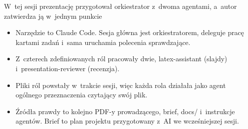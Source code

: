 \begin{frame}{W~tej sesji prezentację przygotował orkiestrator z~dwoma agentami, a~autor zatwierdza ją w~jednym punkcie}
  \begin{itemize}
    \item Narzędzie to Claude Code. Sesja główna jest orkiestratorem, deleguje pracę kartami zadań i~sama uruchamia polecenia sprawdzające.
    \item Z~czterech zdefiniowanych ról pracowały dwie, latex-assistant (slajdy) i~presentation-reviewer (recenzja).
    \item Pliki ról powstały w~trakcie sesji, więc każda rola działała jako agent ogólnego przeznaczenia czytający swój plik.
    \item Źródła prawdy to kolejno PDF-y prowadzącego, brief, docs/ i~instrukcje agentów. Brief to plan projektu przygotowany z~AI we wcześniejszej sesji.
  \end{itemize}
\end{frame}
